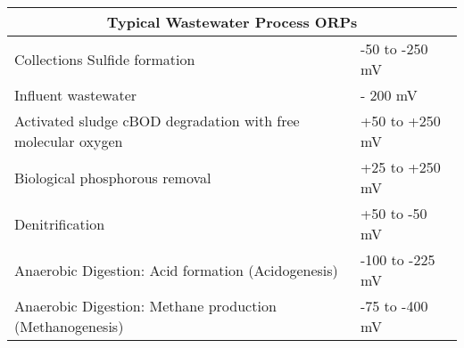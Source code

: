 			
			\setlength{\arrayrulewidth}{0.3mm}
			\setlength{\tabcolsep}{8 pt}
			\renewcommand{\arraystretch}{0.8}
			\begin{center}
				\begin{tabular}{ |p{9.5cm}|p{4.0cm}|}
					\hline
					\multicolumn{2}{|c|}{\textbf{Typical Wastewater Process ORPs}} \\
					\hline
					
					\hline
					\small Collections	Sulfide formation                                & \small -50 to -250 mV  \\
					\small Influent wastewater                                          & \small - 200 mV        \\
					\small Activated sludge	cBOD degradation with free molecular oxygen & \small +50 to +250 mV  \\
					\small Biological phosphorous removal                               & \small +25 to +250 mV  \\
					\small Denitrification                                              & \small +50 to -50 mV   \\
					\small Anaerobic Digestion: Acid formation (Acidogenesis)           & \small -100 to -225 mV \\
					\small Anaerobic Digestion: Methane production (Methanogenesis)     & \small -75 to -400 mV  \\
					\hline
				\end{tabular}
				
			\end{center}
			

